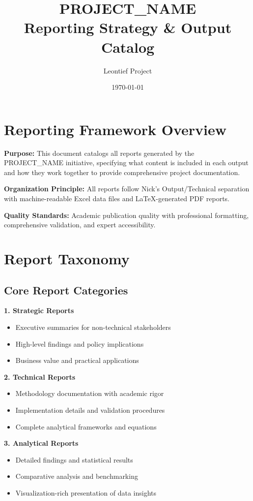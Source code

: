 \documentclass[11pt,letterpaper]{article}
\title{\textbf{PROJECT_NAME}\\Reporting Strategy \& Output Catalog}
\author{Leontief Project}
\date{\today}
\begin{document}
\maketitle

\tableofcontents
\newpage

\section{Reporting Framework Overview}

\textbf{Purpose:} This document catalogs all reports generated by the PROJECT_NAME initiative, specifying what content is included in each output and how they work together to provide comprehensive project documentation.

\textbf{Organization Principle:} All reports follow Nick's Output/Technical separation with machine-readable Excel data files and LaTeX-generated PDF reports.

\textbf{Quality Standards:} Academic publication quality with professional formatting, comprehensive validation, and expert accessibility.

\section{Report Taxonomy}

\subsection{Core Report Categories}

\textbf{1. Strategic Reports}
\begin{itemize}
    \item Executive summaries for non-technical stakeholders
    \item High-level findings and policy implications
    \item Business value and practical applications
\end{itemize}

\textbf{2. Technical Reports}
\begin{itemize}
    \item Methodology documentation with academic rigor
    \item Implementation details and validation procedures
    \item Complete analytical frameworks and equations
\end{itemize}

\textbf{3. Analytical Reports}
\begin{itemize}
    \item Detailed findings and statistical results
    \item Comparative analysis and benchmarking
    \item Visualization-rich presentation of data insights
\end{itemize}
\end{document}

